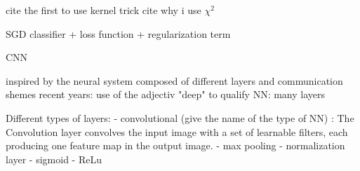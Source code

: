 cite the first to use kernel trick
cite why i use $\chi^2$

SGD classifier + loss function + regularization term%

CNN

inspired by the neural system composed of different layers and communication shemes
recent years: use of the adjectiv "deep" to qualify NN: many layers

Different types of layers:
- convolutional (give the name of the type of NN) : The Convolution layer convolves the input image with a set of learnable filters, each producing one feature map in the output image.
- max pooling
- normalization layer %
- sigmoid
- ReLu